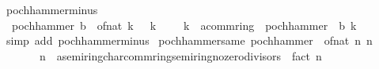 \begin{isabellebody}
\isamarkupfalse%
%
\endisatagproof
{\isafoldproof}%
%
\isadelimproof
\isanewline
%
\endisadelimproof
\isanewline
{}\isamarkupfalse%
\ pochhammer{\isacharunderscore}{\kern0pt}minus{\isacharprime}{\kern0pt}{\isacharcolon}{\kern0pt}\isanewline
\ \ {\isachardoublequoteopen}pochhammer\ {\isacharparenleft}{\kern0pt}b\ {\isacharminus}{\kern0pt}\ of{\isacharunderscore}{\kern0pt}nat\ k\ {\isacharplus}{\kern0pt}\ {}{\isacharparenright}{\kern0pt}\ k\ {\isacharequal}{\kern0pt}\ {\isacharparenleft}{\kern0pt}{\isacharparenleft}{\kern0pt}{\isacharminus}{\kern0pt}\ {}{\isacharparenright}{\kern0pt}\ {\isacharcircum}{\kern0pt}\ k\ {\isacharcolon}{\kern0pt}{\isacharcolon}{\kern0pt}\ {\isacharprime}{\kern0pt}a{\isacharcolon}{\kern0pt}{\isacharcolon}{\kern0pt}comm{\isacharunderscore}{\kern0pt}ring{\isacharunderscore}{\kern0pt}{}{\isacharparenright}{\kern0pt}\ {\isacharasterisk}{\kern0pt}\ pochhammer\ {\isacharparenleft}{\kern0pt}{\isacharminus}{\kern0pt}\ b{\isacharparenright}{\kern0pt}\ k{\isachardoublequoteclose}\isanewline
%
\isadelimproof
\ \ %
\endisadelimproof
%
\isatagproof
{}\isamarkupfalse%
\ {\isacharparenleft}{\kern0pt}simp\ add{\isacharcolon}{\kern0pt}\ pochhammer{\isacharunderscore}{\kern0pt}minus{\isacharparenright}{\kern0pt}%
\endisatagproof
{\isafoldproof}%
%
\isadelimproof
\isanewline
%
\endisadelimproof
\isanewline
{}\isamarkupfalse%
\ pochhammer{\isacharunderscore}{\kern0pt}same{\isacharcolon}{\kern0pt}\ {\isachardoublequoteopen}pochhammer\ {\isacharparenleft}{\kern0pt}{\isacharminus}{\kern0pt}\ of{\isacharunderscore}{\kern0pt}nat\ n{\isacharparenright}{\kern0pt}\ n\ {\isacharequal}{\kern0pt}\isanewline
\ \ \ \ {\isacharparenleft}{\kern0pt}{\isacharparenleft}{\kern0pt}{\isacharminus}{\kern0pt}\ {}{\isacharparenright}{\kern0pt}\ {\isacharcircum}{\kern0pt}\ n\ {\isacharcolon}{\kern0pt}{\isacharcolon}{\kern0pt}\ {\isacharprime}{\kern0pt}a{\isacharcolon}{\kern0pt}{\isacharcolon}{\kern0pt}{\isacharbraceleft}{\kern0pt}semiring{\isacharunderscore}{\kern0pt}char{\isacharunderscore}{\kern0pt}{}{\isacharcomma}{\kern0pt}comm{\isacharunderscore}{\kern0pt}ring{\isacharunderscore}{\kern0pt}{}{\isacharcomma}{\kern0pt}semiring{\isacharunderscore}{\kern0pt}no{\isacharunderscore}{\kern0pt}zero{\isacharunderscore}{\kern0pt}divisors{\isacharbraceright}{\kern0pt}{\isacharparenright}{\kern0pt}\ {\isacharasterisk}{\kern0pt}\ fact\ n{\isachardoublequoteclose}\isanewline
%
\isadelimproof
\ \ %
\endisadelimproof
%
\isatagproof
{}\isamarkupfalse%

\end{isabellebody}
